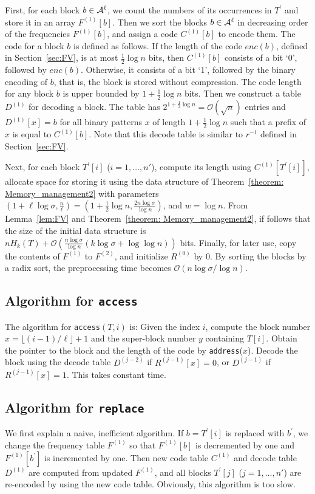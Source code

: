 \documentclass{llncs}
\newcommand{\Order}{\mathcal{O}}
\begin{document}
First, for each block $b \in {\cal A}^\ell$,
we count the numbers of its occurrences in $T^\prime$
and store it in an array $F^{(1)}[b]$.
Then we sort the blocks $b \in {\cal A}^\ell$ in decreasing order of
the frequencies $F^{(1)}[b]$, and assign a code $C^{(1)}[b]$ to encode them.
The code for a block $b$ is defined as follows.
If the length of the code $enc(b)$, defined in Section~\ref{sec:FV},
is at most $\frac{1}{2}\log n$ bits, then $C^{(1)}[b]$ consists of a bit `0',
followed by $enc(b)$.  Otherwise, it consists of a bit `1',
followed by the binary encoding of $b$, that is, the block is stored without
compression.
The code length for any block $b$ is upper bounded 
by $1+\frac{1}{2}\log n$ bits.
Then we construct a table $D^{(1)}$ for decoding a block.
The table has $2^{1+\frac{1}{2}\log n} = \Order(\sqrt{n})$ entries
and $D^{(1)}[x] = b$ for all binary patterns $x$ of length $1+\frac{1}{2}\log n$
such that a prefix of $x$ is equal to $C^{(1)}[b]$.  Note that this decode table
is similar to $r^{-1}$ defined in Section~\ref{sec:FV}.

Next, for each block $T^\prime[i]$ ($i=1,\ldots,n'$), 
compute its length using $C^{(1)}[T^\prime[i]]$,
allocate space for storing it using the data structure of Theorem~\ref{theorem: Memory_management2}
with parameters 
$(1+\ell \log\sigma ,\frac{n}{\ell}) = (1+\frac{1}{2}\log n, \frac{2n \log\sigma}{\log n})$,
and $w = \log n$.
From Lemma~\ref{lem:FV} and Theorem~\ref{theorem: Memory_management2},
if follows that
the size of the initial data structure is $nH_k(T) + \Order\left(\frac{n\log\sigma}{\log n}
(k \log\sigma + \log\log n)\right)$
bits.
Finally, for later use, copy the contents of $F^{(1)}$ to $F^{(2)}$,
and initialize $R^{(0)}$ by $0$.
By sorting the blocks by a radix sort, the preprocessing time becomes
$\Order(n\log\sigma/\log n)$.


\subsection{Algorithm for \texttt{access}}
The algorithm for \texttt{access}$(T,i)$ is:
Given the index $i$,
compute the block number $x = \lfloor (i-1)/\ell \rfloor +1$
and the super-block number $y$ containing $T[i]$.
Obtain the pointer to the block and the length of the code
by \texttt{address}($x$).
Decode the block using the decode table $D^{(j-2)}$ if $R^{(j-1)}[x]=0$,
or $D^{(j-1)}$ if $R^{(j-1)}[x]=1$.
This takes constant time.


\subsection{Algorithm for \texttt{replace}}
We first explain a naive, inefficient algorithm.
If $b = T^\prime[i]$ is replaced with $b^\prime$, we change the frequency
table $F^{(1)}$ 
so that $F^{(1)}[b]$ is decremented by one and $F^{(1)}[b^\prime]$ is
incremented by one.  Then new code table $C^{(1)}$ and decode table $D^{(1)}$
are computed from updated $F^{(1)}$,
and all blocks $T^\prime[j]$ ($j=1,\ldots,n'$) are re-encoded by 
using the new code table.
Obviously, this algorithm is too slow.
\end{document}
